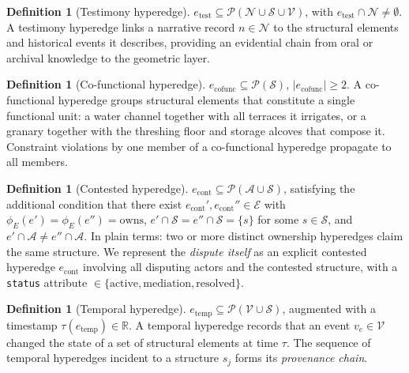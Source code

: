 \documentclass[11pt,a4paper]{article}
\theoremstyle{plain}
\theoremstyle{definition}
\newtheorem{definition}[theorem]{Definition}
\theoremstyle{remark}
\newcommand{\Struc}{\mathcal{S}}
\newcommand{\Act}{\mathcal{A}}
\newcommand{\Nar}{\mathcal{N}}
\newcommand{\Evt}{\mathcal{V}}
\begin{document}
\begin{definition}[Testimony hyperedge]
$e_{\mathrm{test}} \subseteq \mathcal{P}(\Nar \cup \Struc \cup \Evt)$,
with $e_{\mathrm{test}} \cap \Nar \neq \emptyset$.
A testimony hyperedge links a narrative record $n \in \Nar$ to the
structural elements and historical events it describes, providing an
evidential chain from oral or archival knowledge to the geometric layer.
\end{definition}

\begin{definition}[Co-functional hyperedge]
$e_{\mathrm{cofunc}} \subseteq \mathcal{P}(\Struc)$,
$|e_{\mathrm{cofunc}}| \geq 2$.
A co-functional hyperedge groups structural elements that constitute a
single functional unit: a water channel together with all terraces it
irrigates, or a granary together with the threshing floor and storage
alcoves that compose it. Constraint violations by one member of a
co-functional hyperedge propagate to all members.
\end{definition}

\begin{definition}[Contested hyperedge]
$e_{\mathrm{cont}} \subseteq \mathcal{P}(\Act \cup \Struc)$,
satisfying the additional condition that there exist
$e_{\mathrm{cont}}', e_{\mathrm{cont}}'' \in \mathcal{E}$ with
$\phi_E(e') = \phi_E(e'') = \mathrm{owns}$,
$e' \cap \Struc = e'' \cap \Struc = \{s\}$ for some $s \in \Struc$,
and $e' \cap \Act \neq e'' \cap \Act$.
In plain terms: two or more distinct ownership hyperedges claim the
same structure. We represent the \emph{dispute itself} as an explicit
contested hyperedge $e_{\mathrm{cont}}$ involving all disputing actors
and the contested structure, with a \texttt{status} attribute
$\in \{\mathrm{active}, \mathrm{mediation}, \mathrm{resolved}\}$.
\end{definition}

\begin{definition}[Temporal hyperedge]
$e_{\mathrm{temp}} \subseteq \mathcal{P}(\Evt \cup \Struc)$,
augmented with a timestamp $\tau(e_{\mathrm{temp}}) \in \mathbb{R}$.
A temporal hyperedge records that an event $v_e \in \Evt$ changed
the state of a set of structural elements at time $\tau$. The
sequence of temporal hyperedges incident to a structure $s_j$ forms
its \emph{provenance chain}.
\end{definition}
\end{document}
